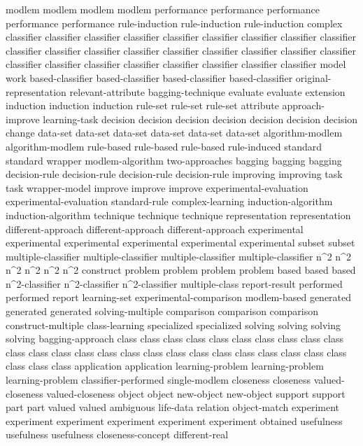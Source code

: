 modlem	modlem	modlem	modlem	
performance	performance	performance	performance	performance	
rule-induction	rule-induction	rule-induction	
complex	
classifier	classifier	classifier	classifier	classifier	classifier	classifier	classifier	classifier	classifier	classifier	classifier	classifier	classifier	classifier	classifier	classifier	classifier	classifier	classifier	classifier	classifier	classifier	classifier	classifier	classifier	
model	
work	
based-classifier	based-classifier	based-classifier	based-classifier	
original-representation	
relevant-attribute	
bagging-technique	
evaluate	evaluate	
extension	
induction	induction	induction	
rule-set	rule-set	rule-set	
attribute	
approach-improve	
learning-task	
decision	decision	decision	decision	decision	decision	decision	
change	
data-set	data-set	data-set	data-set	data-set	data-set	
algorithm-modlem	algorithm-modlem	
rule-based	rule-based	rule-based	
rule-induced	
standard	standard	
wrapper	
modlem-algorithm	
two-approaches	
bagging	bagging	bagging	
decision-rule	decision-rule	decision-rule	decision-rule	
improving	improving	
task	task	
wrapper-model	
improve	improve	improve	
experimental-evaluation	experimental-evaluation	
standard-rule	
complex-learning	
induction-algorithm	induction-algorithm	
technique	technique	technique	
representation	representation	
different-approach	different-approach	different-approach	
experimental	experimental	experimental	experimental	experimental	experimental	
subset	subset	
multiple-classifier	multiple-classifier	multiple-classifier	multiple-classifier	
n^2	n^2	n^2	n^2	n^2	n^2	
construct	
problem	problem	problem	problem	
based	based	based	
n^2-classifier	n^2-classifier	n^2-classifier	
multiple-class	
report-result	
performed	performed	
report	
learning-set	
experimental-comparison	
modlem-based	
generated	generated	generated	
solving-multiple	
comparison	comparison	comparison	
construct-multiple	
class-learning	
specialized	specialized	
solving	solving	solving	solving	
bagging-approach	
class	class	class	class	class	class	class	class	class	class	class	class	class	class	class	class	class	class	class	class	class	class	class	class	class	class	class	class	
application	application	
learning-problem	learning-problem	learning-problem	
classifier-performed	
single-modlem	
closeness	closeness	
valued-closeness	valued-closeness	
object	object	
new-object	new-object	
support	support	
part	part	
valued	valued	
ambiguous	
life-data	
relation	
object-match	
experiment	experiment	experiment	experiment	experiment	experiment	
obtained	
usefulness	usefulness	usefulness	
closeness-concept	
different-real	
